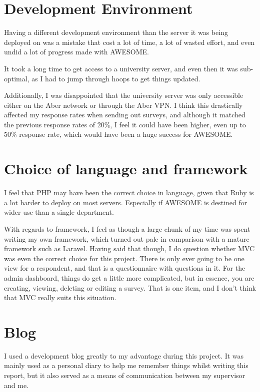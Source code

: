 	\section{Development Environment}
	
	Having a different development environment than the server it was being deployed on was a mistake that cost a lot of time, a lot of wasted effort, and even undid a lot of progress made with \ac{AWESOME}.
	
	It took a long time to get access to a university server, and even then it was sub-optimal, as I had to jump through hoops to get things updated.
	
	Additionally, I was disappointed that the university server was only accessible either on the Aber network or through the Aber VPN.
	I think this drastically affected my response rates when sending out surveys, and although it matched the previous response rates of 20\%, I feel it could have been higher, even up to 50\% response rate, which would have been a huge success for \ac{AWESOME}.
	
	\section{Choice of language and framework}
	
	I feel that PHP may have been the correct choice in language, given that Ruby is a lot harder to deploy on most servers.
	Especially if \ac{AWESOME} is destined for wider use than a single department.
	
	With regards to framework, I feel as though a large chunk of my time was spent writing my own framework, which turned out pale in comparison with a mature framework such as Laravel.
	Having said that though, I do question whether MVC was even the correct choice for this project.
	There is only ever going to be one view for a respondent, and that is a questionnaire with questions in it.
	For the admin dashboard, things do get a little more complicated, but in essence, you are creating, viewing, deleting or editing a survey.
	That is one item, and I don't think that \ac{MVC} really suits this situation.
		
	\section{Blog}
	
	I used a development blog greatly to my advantage during this project.
	It was mainly used as a personal diary to help me remember things whilst writing this report, but it also served as a means of communication between my supervisor and me.
	
